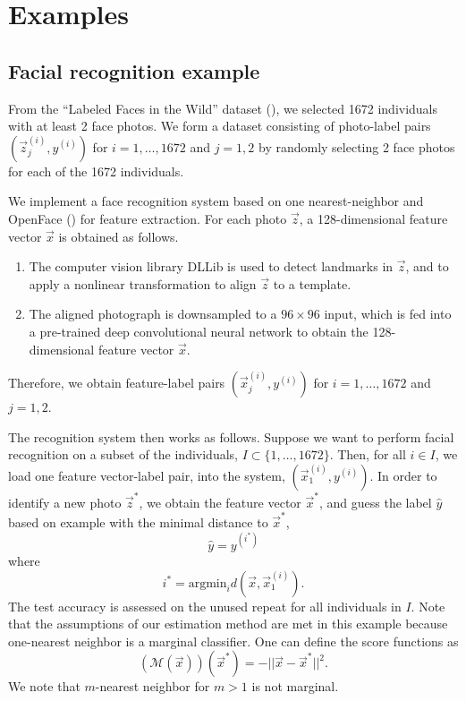 \documentclass[12pt]{article}
\begin{document}
\section{Examples}\label{sec:extrapolation_example}

\subsection{Facial recognition example}

From the ``Labeled Faces in the Wild'' dataset (\cite{LFWTech}), we
selected 1672 individuals with at least 2 face photos.  We form a
dataset consisting of photo-label pairs $(\vec{z}_j^{(i)}, y^{(i)})$
for $i = 1,\hdots, 1672$ and $j = 1,2$ by randomly selecting 2 face
photos for each of the 1672 individuals.

We implement a face recognition system based on one nearest-neighbor
and OpenFace (\cite{amos2016openface}) for feature extraction.  For
each photo $\vec{z}$, a 128-dimensional feature vector $\vec{x}$ is
obtained as follows.
\begin{enumerate}
\item The computer vision library DLLib is used to detect landmarks in
  $\vec{z}$, and to apply a nonlinear transformation to align
  $\vec{z}$ to a template.
\item The aligned photograph is downsampled to a $96 \times 96$ input,
  which is fed into a pre-trained deep convolutional neural network to
  obtain the 128-dimensional feature vector $\vec{x}$.
\end{enumerate}
Therefore, we obtain feature-label pairs $(\vec{x}_j^{(i)}, y^{(i)})$
for $i = 1,\hdots, 1672$ and $j = 1,2$.

The recognition system then works as follows.  Suppose we want to
perform facial recognition on a subset of the individuals, $I \subset
\{1,\hdots, 1672\}$.  Then, for all $i \in I$, we load one feature
vector-label pair, into the system, $(\vec{x}_1^{(i)}, y^{(i)})$.  In
order to identify a new photo $\vec{z}^*$, we obtain the feature
vector $\vec{x}^*$, and guess the label $\hat{y}$ based on example
with the minimal distance to $\vec{x}^*$,
\[
\hat{y} = y^{(i^*)}
\]
where
\[
i^* = \text{argmin}_i d(\vec{x}, \vec{x}_1^{(i)}).
\]
The test accuracy is assessed on the unused repeat for all individuals
in $I$.  Note that the assumptions of our estimation method are met in
this example because one-nearest neighbor is a marginal classifier.
One can define the score functions as
\[
(\mathcal{M}(\vec{x}))(\vec{x}^*) = -||\vec{x} - \vec{x}^*||^2.
\]
We note that $m$-nearest neighbor for $m > 1$ is not marginal.
\end{document}
